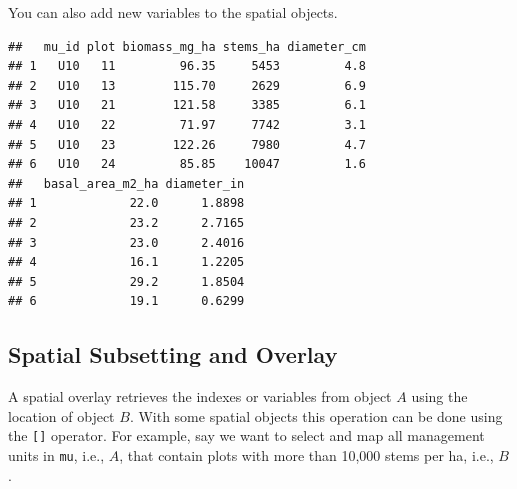 \documentclass[
]{krantz}
\newenvironment{Shaded}{\begin{snugshade}}{\end{snugshade}}
\newcommand{\FloatTok}[1]{\textcolor[rgb]{0.00,0.00,0.81}{#1}}
\newcommand{\KeywordTok}[1]{\textcolor[rgb]{0.13,0.29,0.53}{\textbf{#1}}}
\newcommand{\NormalTok}[1]{#1}
\newcommand{\OperatorTok}[1]{\textcolor[rgb]{0.81,0.36,0.00}{\textbf{#1}}}
\newcommand{\StringTok}[1]{\textcolor[rgb]{0.31,0.60,0.02}{#1}}
\begin{document}
You can also add new variables to the spatial objects.

\begin{Shaded}
\end{Shaded}

\begin{verbatim}
##   mu_id plot biomass_mg_ha stems_ha diameter_cm
## 1   U10   11         96.35     5453         4.8
## 2   U10   13        115.70     2629         6.9
## 3   U10   21        121.58     3385         6.1
## 4   U10   22         71.97     7742         3.1
## 5   U10   23        122.26     7980         4.7
## 6   U10   24         85.85    10047         1.6
##   basal_area_m2_ha diameter_in
## 1             22.0      1.8898
## 2             23.2      2.7165
## 3             23.0      2.4016
## 4             16.1      1.2205
## 5             29.2      1.8504
## 6             19.1      0.6299
\end{verbatim}

\hypertarget{spatial-subsetting-and-overlay}{%
\subsection{Spatial Subsetting and Overlay}\label{spatial-subsetting-and-overlay}}

A spatial overlay retrieves the indexes or variables from object \(A\) using the location of object \(B\). With some spatial objects this operation can be done using the \texttt{{[}{]}} operator. For example, say we want to select and map all management units in \texttt{mu}, i.e., \(A\), that contain plots with more than 10,000 stems per ha, i.e., \(B\).
\end{document}
